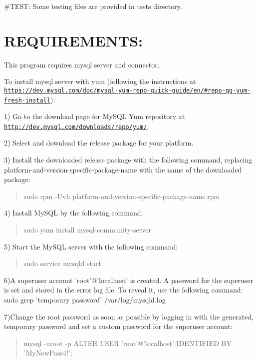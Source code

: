 \#\-T\-E\-S\-T\-: Some testing files are provided in tests directory.

\section*{R\-E\-Q\-U\-I\-R\-E\-M\-E\-N\-T\-S\-:}

This program requires mysql server and connector.

To install mysql server with yum (following the instructions at \href{https://dev.mysql.com/doc/mysql-yum-repo-quick-guide/en/#repo-qg-yum-fresh-install}{\tt https\-://dev.\-mysql.\-com/doc/mysql-\/yum-\/repo-\/quick-\/guide/en/\#repo-\/qg-\/yum-\/fresh-\/install})\-:

1) Go to the download page for My\-S\-Q\-L Yum repository at \href{http://dev.mysql.com/downloads/repo/yum/}{\tt http\-://dev.\-mysql.\-com/downloads/repo/yum/}.

2) Select and download the release package for your platform.

3) Install the downloaded release package with the following command, replacing platform-\/and-\/version-\/specific-\/package-\/name with the name of the downloaded package\-: \begin{quotation}
sudo rpm -\/\-Uvh platform-\/and-\/version-\/specific-\/package-\/name.\-rpm

\end{quotation}


4) Install My\-S\-Q\-L by the following command\-: \begin{quotation}
sudo yum install mysql-\/community-\/server

\end{quotation}


5) Start the My\-S\-Q\-L server with the following command\-: \begin{quotation}
sudo service mysqld start

\end{quotation}


6)A superuser account 'root'@'localhost' is created. A password for the superuser is set and stored in the error log file. To reveal it, use the following command\-: sudo grep 'temporary password' /var/log/mysqld.log

7)Change the root password as soon as possible by logging in with the generated, temporary password and set a custom password for the superuser account\-: \begin{quotation}
mysql -\/uroot -\/p A\-L\-T\-E\-R U\-S\-E\-R 'root'@'localhost' I\-D\-E\-N\-T\-I\-F\-I\-E\-D B\-Y 'My\-New\-Pass4!';

\end{quotation}


